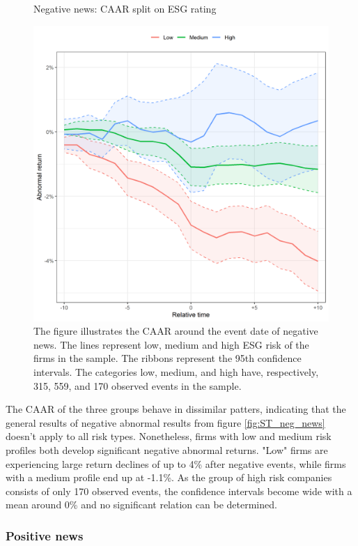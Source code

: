 \begin{figure} [H]
    \centering
    \caption{Negative news: CAAR split on ESG rating}
    \includegraphics[scale=0.6]{Projekt/1.Figures analysis/ST_negative_ESG.png}
     \caption*{\footnotesize The figure illustrates the CAAR around the event date of negative news. The lines represent low, medium and high ESG risk of the firms in the sample. The ribbons represent the 95th confidence intervals. The categories low, medium, and high have, respectively, 315, 559, and 170 observed events in the sample. }
    \label{fig:ST_neg_ESG}
\end{figure} 


The CAAR of the three groups behave in dissimilar patters, indicating that the general results of negative abnormal results from figure \ref{fig:ST_neg_news} doesn't apply to all risk types.
Nonetheless, firms with low and medium risk profiles both develop significant negative abnormal returns. "Low" firms are experiencing large return declines of up to 4\% after negative events, while firms with a medium profile end up at -1.1\%. As the group of high risk companies consists of only 170 observed events, the confidence intervals become wide with a mean around 0\% and no significant relation can be determined. 



\subsubsection{Positive news}

